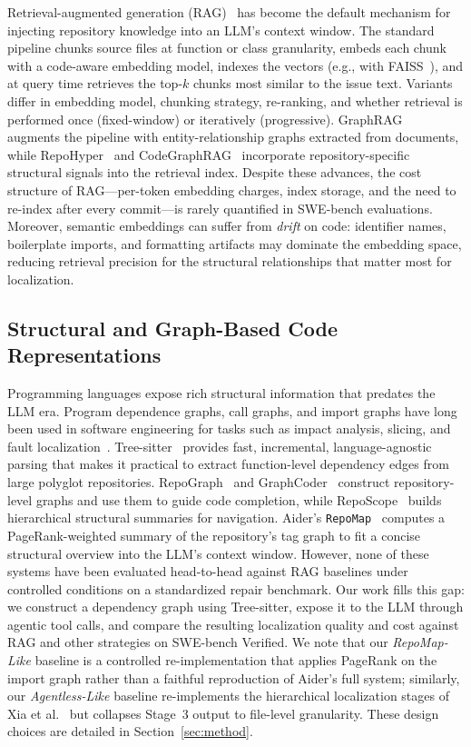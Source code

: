 Retrieval-augmented generation (RAG)~\cite{lewis2020rag} has become the default mechanism for injecting repository knowledge into an LLM's context window. The standard pipeline chunks source files at function or class granularity, embeds each chunk with a code-aware embedding model, indexes the vectors (e.g., with FAISS~\cite{johnson2021faiss}), and at query time retrieves the top-$k$ chunks most similar to the issue text. Variants differ in embedding model, chunking strategy, re-ranking, and whether retrieval is performed once (fixed-window) or iteratively (progressive). GraphRAG~\cite{edge2024graphrag} augments the pipeline with entity-relationship graphs extracted from documents, while RepoHyper~\cite{repohyper2024} and CodeGraphRAG~\cite{codegraphrag} incorporate repository-specific structural signals into the retrieval index. Despite these advances, the cost structure of RAG---per-token embedding charges, index storage, and the need to re-index after every commit---is rarely quantified in SWE-bench evaluations. Moreover, semantic embeddings can suffer from \emph{drift} on code: identifier names, boilerplate imports, and formatting artifacts may dominate the embedding space, reducing retrieval precision for the structural relationships that matter most for localization.

\subsection{Structural and Graph-Based Code Representations}

Programming languages expose rich structural information that predates the LLM era. Program dependence graphs, call graphs, and import graphs have long been used in software engineering for tasks such as impact analysis, slicing, and fault localization~\cite{lv2011lower}. Tree-sitter~\cite{brunsfeld2018treesitter} provides fast, incremental, language-agnostic parsing that makes it practical to extract function-level dependency edges from large polyglot repositories. RepoGraph~\cite{repograph2024} and GraphCoder~\cite{graphcoder2024} construct repository-level graphs and use them to guide code completion, while RepoScope~\cite{reposcope2025} builds hierarchical structural summaries for navigation. Aider's \texttt{RepoMap}~\cite{aider2023} computes a PageRank-weighted summary of the repository's tag graph to fit a concise structural overview into the LLM's context window. However, none of these systems have been evaluated head-to-head against RAG baselines under controlled conditions on a standardized repair benchmark. Our work fills this gap: we construct a dependency graph using Tree-sitter, expose it to the LLM through agentic tool calls, and compare the resulting localization quality and cost against RAG and other strategies on SWE-bench Verified. We note that our \emph{RepoMap-Like} baseline is a controlled re-implementation that applies PageRank on the import graph rather than a faithful reproduction of Aider's full system; similarly, our \emph{Agentless-Like} baseline re-implements the hierarchical localization stages of Xia et al.~\cite{xia2024agentless} but collapses Stage~3 output to file-level granularity. These design choices are detailed in Section~\ref{sec:method}.


